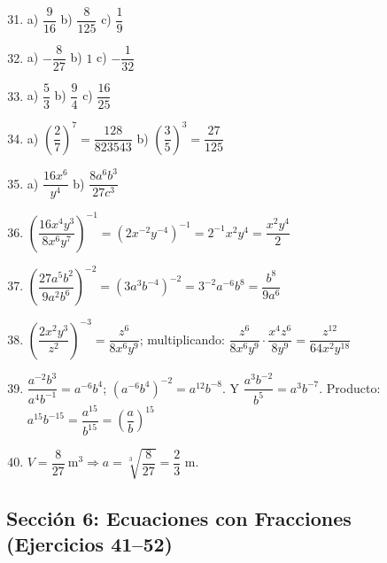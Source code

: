 \documentclass[12pt, letterpaper]{article}
\begin{document}
  \begin{enumerate}[leftmargin=*, label=\textbf{\arabic*.}]
    \setcounter{enumi}{30}
    \item a) $\dfrac{9}{16}$ \quad b) $\dfrac{8}{125}$ \quad c) $\dfrac{1}{9}$

    \item a) $-\dfrac{8}{27}$ \quad b) $1$ \quad c) $-\dfrac{1}{32}$

    \item a) $\dfrac{5}{3}$ \quad b) $\dfrac{9}{4}$ \quad c) $\dfrac{16}{25}$

    \item a) $\left(\dfrac{2}{7}\right)^7 = \dfrac{128}{823543}$ \quad b) $\left(\dfrac{3}{5}\right)^3 = \dfrac{27}{125}$

    \item a) $\dfrac{16x^6}{y^4}$ \quad b) $\dfrac{8a^6b^3}{27c^3}$

    \item $\left(\dfrac{16x^4y^3}{8x^6y^7}\right)^{-1} = \left(2x^{-2}y^{-4}\right)^{-1} = 2^{-1}x^2y^4 = \dfrac{x^2y^4}{2}$

    \item $\left(\dfrac{27a^5b^2}{9a^2b^6}\right)^{-2} = \left(3a^3b^{-4}\right)^{-2} = 3^{-2}a^{-6}b^8 = \dfrac{b^8}{9a^6}$

    \item $\left(\dfrac{2x^2y^3}{z^2}\right)^{-3} = \dfrac{z^6}{8x^6y^9}$; multiplicando: $\dfrac{z^6}{8x^6y^9} \cdot \dfrac{x^4z^6}{8y^9} = \dfrac{z^{12}}{64x^2y^{18}}$

    \item $\dfrac{a^{-2}b^3}{a^4b^{-1}} = a^{-6}b^4$; $\left(a^{-6}b^4\right)^{-2} = a^{12}b^{-8}$. Y $\dfrac{a^3b^{-2}}{b^5} = a^3b^{-7}$. Producto: $a^{15}b^{-15} = \dfrac{a^{15}}{b^{15}} = \left(\dfrac{a}{b}\right)^{15}$

    \item $V = \dfrac{8}{27}\ \text{m}^3 \Rightarrow a = \sqrt[3]{\dfrac{8}{27}} = \dfrac{2}{3}$ m.
  \end{enumerate}

  \newpage

  \subsection*{Sección 6: Ecuaciones con Fracciones (Ejercicios 41--52)}
\end{document}

